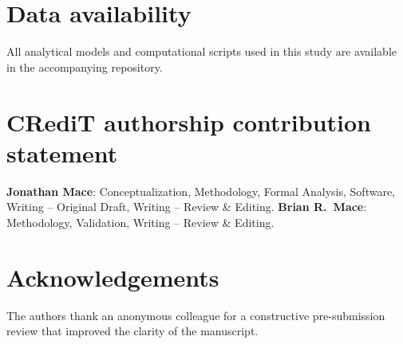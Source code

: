 \documentclass[review]{elsarticle}
\begin{document}











\section*{Data availability}
All analytical models and computational scripts used in this study are
available in the accompanying repository.

\section*{CRediT authorship contribution statement}
\textbf{Jonathan Mace}: Conceptualization, Methodology, Formal Analysis,
Software, Writing -- Original Draft, Writing -- Review \& Editing.
\textbf{Brian R.\ Mace}: Methodology, Validation, Writing -- Review \& Editing.

\section*{Acknowledgements}
The authors thank an anonymous colleague for a constructive pre-submission
review that improved the clarity of the manuscript.
\end{document}
